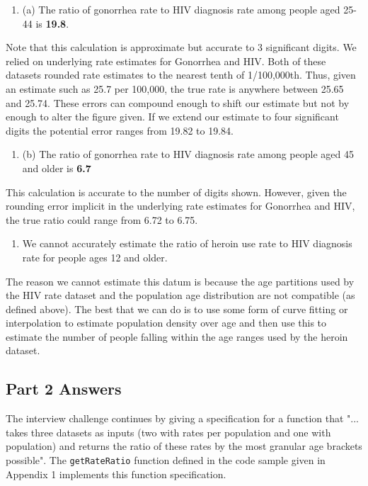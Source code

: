 \documentclass[]{article}
\begin{document}
\begin{enumerate}
\def\labelenumi{\arabic{enumi}.}
\item
  (a) The ratio of gonorrhea rate to HIV diagnosis rate among people
  aged 25-44 is \textbf{19.8}.
\end{enumerate}

Note that this calculation is approximate but accurate to 3 significant
digits. We relied on underlying rate estimates for Gonorrhea and HIV.
Both of these datasets rounded rate estimates to the nearest tenth of
1/100,000th. Thus, given an estimate such as 25.7 per 100,000, the true
rate is anywhere between 25.65 and 25.74. These errors can compound
enough to shift our estimate but not by enough to alter the figure
given. If we extend our estimate to four significant digits the
potential error ranges from 19.82 to 19.84.

\begin{enumerate}
\def\labelenumi{\arabic{enumi}.}
\item
  (b) The ratio of gonorrhea rate to HIV diagnosis rate among people
  aged 45 and older is \textbf{6.7}
\end{enumerate}

This calculation is accurate to the number of digits shown. However,
given the rounding error implicit in the underlying rate estimates for
Gonorrhea and HIV, the true ratio could range from 6.72 to 6.75.

\begin{enumerate}
\def\labelenumi{\arabic{enumi}.}
\item
  We cannot accurately estimate the ratio of heroin use rate to HIV
  diagnosis rate for people ages 12 and older.
\end{enumerate}

The reason we cannot estimate this datum is because the age partitions
used by the HIV rate dataset and the population age distribution are not
compatible (as defined above). The best that we can do is to use some
form of curve fitting or interpolation to estimate population density
over age and then use this to estimate the number of people falling
within the age ranges used by the heroin dataset.

\hypertarget{part-2-answers}{%
\subsection{Part 2 Answers}\label{part-2-answers}}

The interview challenge continues by giving a specification for a
function that "... takes three datasets as inputs (two with rates per
population and one with population) and returns the ratio of these rates
by the most granular age brackets possible". The \texttt{getRateRatio}
function defined in the code sample given in Appendix 1 implements this
function specification.
\end{document}
